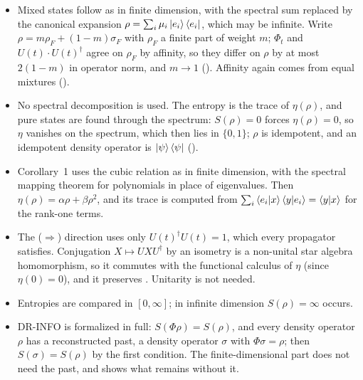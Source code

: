 \documentclass[11pt]{article}
\begin{document}
\begin{itemize}
  norm; instead, for a fixed unit vector $e$, $\Phi_t$ extended by polarization gives
  $(\ket{U x}\bra{U e})\,e = \braket{U e|e}\,U x$, and dividing by $|\braket{U e|e}|$ fixes the
  phase one vector at a time. So $t \mapsto U(t)x$ is differentiable at $t_0$ for each $x$. By
  Banach--Steinhaus, applied to the difference quotients, the derivatives $x \mapsto
  (U(\cdot)x)'(t_0)$ form a bounded operator $A$. Differentiating $\braket{U(t)x|U(t)y} =
  \braket{x|y}$ gives $A^\dagger = -A$, and $H = i\hbar A$.
\item Mixed states follow as in finite dimension, with the spectral sum replaced by the canonical
  expansion $\rho = \sum_i \mu_i \ket{e_i}\bra{e_i}$, which may be infinite. Write
  $\rho = m\rho_F + (1-m)\sigma_F$ with $\rho_F$ a finite part of weight $m$; $\Phi_t$ and
  $U(t)\cdot U(t)^\dagger$ agree on $\rho_F$ by affinity, so they differ on $\rho$ by at most
  $2(1-m)$ in operator norm, and $m \to 1$ ().
  Affinity again comes from equal mixtures ().
\item No spectral decomposition is used. The entropy is the trace of $\eta(\rho)$, and pure states
  are found through the spectrum: $S(\rho) = 0$ forces $\eta(\rho) = 0$, so $\eta$ vanishes on
  the spectrum, which then lies in $\{0, 1\}$; $\rho$ is idempotent, and an idempotent density
  operator is $\ket{\psi}\bra{\psi}$ ().
\item Corollary~1 uses the cubic relation as in finite dimension, with the spectral mapping
  theorem for polynomials in place of eigenvalues. Then $\eta(\rho) = \alpha\rho + \beta\rho^2$,
  and its trace is computed from $\sum_i \braket{e_i|x}\braket{y|e_i} = \braket{y|x}$ for the
  rank-one terms.
\item The ($\Rightarrow$) direction uses only $U(t)^\dagger U(t) = 1$, which every propagator
  satisfies. Conjugation $X \mapsto UXU^\dagger$ by an isometry is a non-unital star algebra
  homomorphism, so it commutes with the functional calculus of $\eta$ (since $\eta(0) = 0$), and
  it preserves . Unitarity is not needed.
\item Entropies are compared in $[0,\infty]$; in infinite dimension $S(\rho) = \infty$ occurs.
\item DR-INFO is formalized in full: $S(\Phi\rho) = S(\rho)$, and every density operator $\rho$
  has a reconstructed past, a density operator $\sigma$ with $\Phi\sigma = \rho$; then
  $S(\sigma) = S(\rho)$ by the first condition. The finite-dimensional part does not need the past,
  and  shows what remains without it.
\end{itemize}
\end{document}
